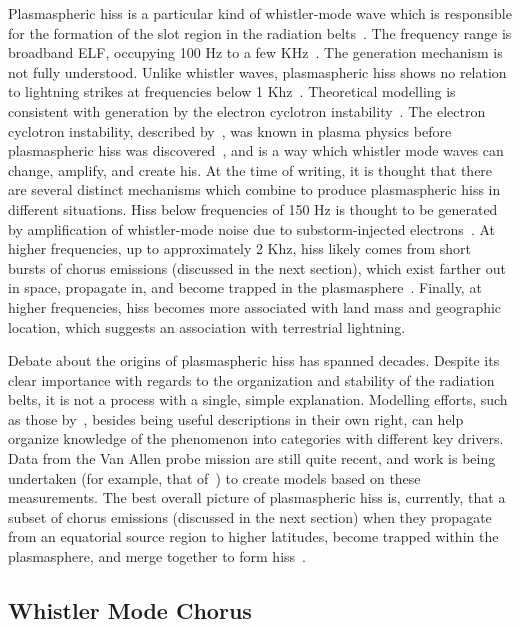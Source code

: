 Plasmaspheric hiss is a particular kind of whistler-mode wave which is responsible for the formation of the slot region in the radiation belts~\citep{lyons1972, lyons1973}. The frequency range is broadband ELF, occupying 100 Hz to a few KHz~\citep{millan2007}. The generation mechanism is not fully understood. Unlike whistler waves, plasmaspheric hiss shows no relation to lightning strikes at frequencies below 1 Khz~\citep{meredith04}. Theoretical modelling is consistent with generation by the electron cyclotron instability~\citep{millan2007, huang1983, church1983, meredith04}. The electron cyclotron instability, described by~\cite{thorne1979a}, was known in plasma physics before plasmaspheric hiss was discovered~\citep{kennel1966}, and is a way which whistler mode waves can change, amplify, and create his. At the time of writing, it is thought that there are several distinct mechanisms which combine to produce plasmaspheric hiss in different situations. Hiss below frequencies of 150 Hz is thought to be generated by amplification of whistler-mode noise due to substorm-injected electrons~\citep{meridith2018}. At higher frequencies, up to approximately 2 Khz, hiss likely comes from short bursts of chorus emissions (discussed in the next section), which exist farther out in space, propagate in, and become trapped in the plasmasphere~\citep{meridith2018}. Finally, at higher frequencies, hiss becomes more associated with land mass and geographic location, which suggests an association with terrestrial lightning. 

Debate about the origins of plasmaspheric hiss has spanned decades. Despite its clear importance with regards to the organization and stability of the radiation belts, it is not a process with a single, simple explanation. Modelling efforts, such as those by~\citep{meridith2018}, besides being useful descriptions in their own right, can help organize knowledge of the phenomenon into categories with different key drivers. Data from the Van Allen probe mission are still quite recent, and work is being undertaken (for example, that of~\cite{Li2015}) to create models based on these measurements. The best overall picture of plasmaspheric hiss is, currently, that a subset of chorus emissions (discussed in the next section) when they propagate from an equatorial source region to higher latitudes, become trapped within the plasmasphere, and merge together to form hiss~\citep{thorne2010,bortnick2008,bortnick2009}.

\subsection{Whistler Mode Chorus}

